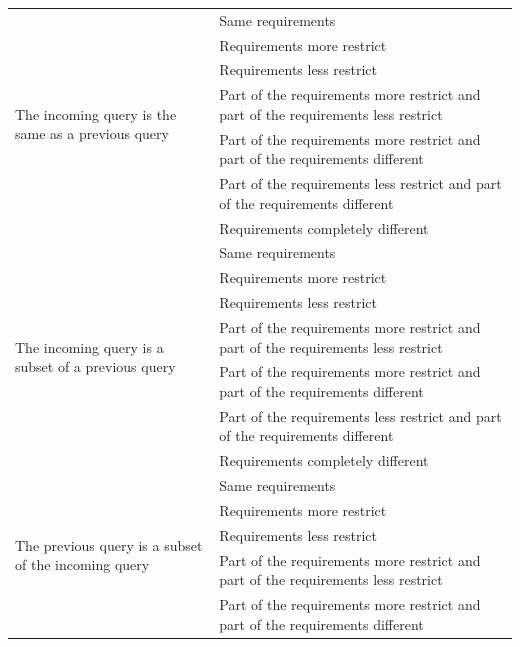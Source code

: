 \documentclass[12pt,a4paper,oneside]{article}
\begin{document}
\begin{center}
\begin{longtable}{|l|p{8cm}|}
\multirow{7}{6cm}{The incoming query is the same as a previous query}  & Same requirements \\ \cline{2-2} 
                  & Requirements more restrict \\ \cline{2-2} 
                  & Requirements less restrict \\ \cline{2-2} 
                  & Part of the requirements more restrict and part of the requirements less restrict \\ \cline{2-2} 
                  & Part of the requirements more restrict and part of the requirements different \\ \cline{2-2} 
                  & Part of the requirements less restrict and part of the requirements different \\ \cline{2-2} 
                  & Requirements completely different \\ \hline
\multirow{7}{6cm}{The incoming query is a subset of a previous query}  &Same requirements \\ \cline{2-2} 
                  & Requirements more restrict \\ \cline{2-2} 
                  & Requirements less restrict \\ \cline{2-2} 
                  & Part of the requirements more restrict and part of the requirements less restrict \\ \cline{2-2} 
                  & Part of the requirements more restrict and part of the requirements different \\ \cline{2-2} 
                  & Part of the requirements less restrict and part of the requirements different \\ \cline{2-2} 
                  & Requirements completely different \\ \hline
\multirow{7}{6cm}{The previous query is a subset of the incoming query}  & Same requirements \\ \cline{2-2} 
                  & Requirements more restrict \\ \cline{2-2} 
                  & Requirements less restrict \\ \cline{2-2} 
                  & Part of the requirements more restrict and part of the requirements less restrict \\ \cline{2-2} 
                  & Part of the requirements more restrict and part of the requirements different \\ \cline{2-2} 

\end{longtable}
\end{center}
\end{document}
